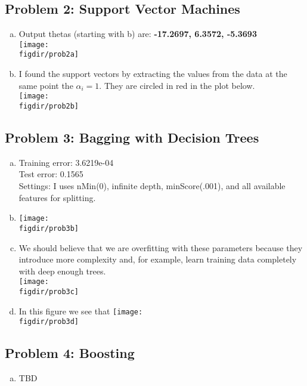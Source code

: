 \documentclass[twoside,11pt]{article}
\newcommand{\figdir}{figs}
\theoremstyle{definition}
\begin{document}

\subsection*{Problem 2: Support Vector Machines}

\begin{enumerate}[(a)]
\item Output thetas (starting with b) are: \textbf{-17.2697, 6.3572, -5.3693} \\
\texttt{[image: \\figdir/prob2a]}
\item I found the support vectors by extracting the values from the data at the same point the $\alpha_i = 1$.  They are circled in red in the plot below. \\
	\texttt{[image: \\figdir/prob2b]}
\end{enumerate}


\subsection*{Problem 3: Bagging with Decision Trees}

\begin{enumerate}[(a)]
\item Training error: 3.6219e-04 \\
Test error: 0.1565 \\
Settings: I uses nMin(0), infinite depth, minScore(.001), and all available features for splitting.

\item \texttt{[image: \\figdir/prob3b]}

\item We should believe that we are overfitting with these parameters because they introduce more complexity and, for example, learn training data completely with deep enough trees. \\
\texttt{[image: \\figdir/prob3c]}

\item In this figure we see that 
\texttt{[image: \\figdir/prob3d]}
\end{enumerate}


\subsection*{Problem 4: Boosting}

\begin{enumerate}[(a)]
\item TBD
\end{enumerate}
\end{document}
